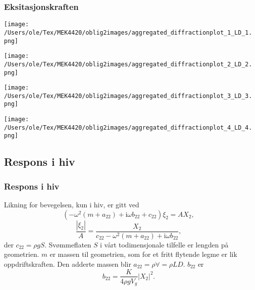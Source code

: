 \documentclass{beamer}
\begin{document}
\begin{frame}
\frametitle{Eksitasjonskraften}
\noindent
\begin{minipage}[t]{0.45\linewidth}
    \texttt{[image: /Users/ole/Tex/MEK4420/oblig2images/aggregated\_diffractionplot\_1\_LD\_1.png]}
    \label{fig:a22_1}
\end{minipage}
\hspace{0.05\linewidth}
\begin{minipage}[t]{0.45\linewidth}
    \texttt{[image: /Users/ole/Tex/MEK4420/oblig2images/aggregated\_diffractionplot\_2\_LD\_2.png]}
    \label{fig:a22_2}
\end{minipage}
\vspace{-0.2cm} %
\noindent
\begin{minipage}[t]{0.45\linewidth}
    \texttt{[image: /Users/ole/Tex/MEK4420/oblig2images/aggregated\_diffractionplot\_3\_LD\_3.png]}
    \label{fig:a22_3}
\end{minipage}
\hspace{0.05\linewidth}
\begin{minipage}[t]{0.45\linewidth}
    \texttt{[image: /Users/ole/Tex/MEK4420/oblig2images/aggregated\_diffractionplot\_4\_LD\_4.png]}
    \label{fig:a22_4}
\end{minipage} 
\end{frame}

\subsection{Respons i hiv}
\begin{frame}
\frametitle{Respons i hiv}
Likning for bevegelsen, kun i hiv, er gitt ved
\begin{equation}
( - \omega^2(m+a_{22}) + \mathrm{i}\omega b_{22}+ c_{22})\xi_2 = AX_2, 
\end{equation}
\begin{equation}
\frac{|\xi_2|}{A} = \frac{X_2}{c_{22} - \omega^2(m+a_{22}) + \mathrm{i}\omega b_{22}}, 
\end{equation}
der $c_{22} = \rho g S$. Svømmeflaten $S$ i vårt todimensjonale tilfelle er lengden på geometrien. $m$ er massen til geometrien, som for et fritt flytende legme er lik oppdriftskraften. Den adderte massen blir $a_{22} = \rho \forall = \rho LD$. $b_{22}$ er
\begin{equation}
b_{22} = \frac{K }{4\rho g V_g}|X_2|^2. 
\end{equation}
\end{frame}
\end{document}

